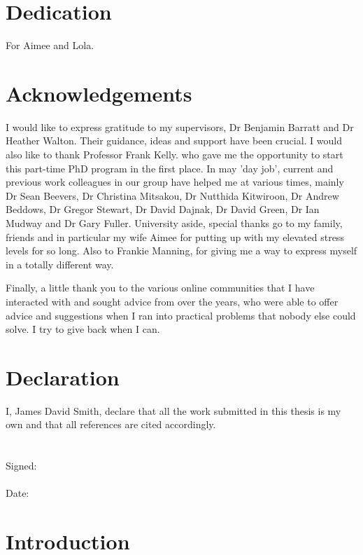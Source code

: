 \documentclass[12pt]{report}
\begin{document}
\chapter*{Dedication}
For Aimee and Lola.

\chapter*{Acknowledgements}
I would like to express gratitude to my supervisors, Dr Benjamin Barratt and Dr Heather Walton. Their guidance, ideas and support have been crucial. I would also like to thank Professor Frank Kelly. who gave me the opportunity to start this part-time PhD program in the first place. In may 'day job', current and previous work colleagues in our group have helped me at various times, mainly Dr Sean Beevers, Dr Christina Mitsakou, Dr Nutthida Kitwiroon, Dr Andrew Beddows, Dr Gregor Stewart, Dr David Dajnak, Dr David Green, Dr Ian Mudway and Dr Gary Fuller. University aside, special thanks go to my family, friends and in particular my wife Aimee for putting up with my elevated stress levels for so long. Also to Frankie Manning, for giving me a way to express myself in a totally different way.

Finally, a little thank you to the various online communities that I have interacted with and sought advice from over the years, who were able to offer advice and suggestions when I ran into practical problems that nobody else could solve. I try to give back when I can.

\chapter*{Declaration}

I, James David Smith, declare that all the work submitted in this thesis is my own and that all references are cited accordingly.\\
\\
\\
Signed: \underline{\hspace{6cm}}
\\
\\
Date: \hspace{0.16cm} \underline{\hspace{6cm}}

\tableofcontents
\listoffigures
\listoftables
\glsnogroupskiptrue

\chapter{Introduction}

\label{chap:intro}
\end{document}
